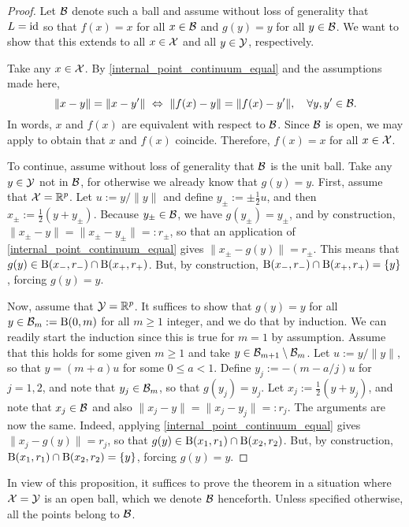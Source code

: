 \documentclass[twoside, 11pt]{article}
\begin{document}
\begin{proof}
Let $\mathcal{B}$ denote such a ball and assume without loss of generality that $L = {\rm id}$ so that $f(x) = x$ for all $x \in \mathcal{B}$ and $g(y) = y$ for all $y \in \mathcal{B}$. 
We want to show that this extends to all $x\in\mathcal{X}$ and all $y\in\mathcal{Y}$, respectively.

Take any $x\in\mathcal{X}$. 
By \eqref{internal_point_continuum_equal} and the assumptions made here,  
\[\|x-y\| = \|x-y'\| \ \Leftrightarrow \  \|f(x)-y\| = \|f(x)-y'\|, \quad \forall y,y' \in \mathcal{B}.\]
In words, $x$ and $f(x)$ are equivalent with respect to $\mathcal{B}$. Since $\mathcal{B}$ is open, we may apply  to obtain that $x$ and $f(x)$ coincide. Therefore, $f(x) = x$ for all $x \in \mathcal{X}$.

To continue, assume without loss of generality that $\mathcal{B}$ is the unit ball. 
Take any $y \in \mathcal{Y}$ not in $\mathcal{B}$, for otherwise we already know that $g(y) = y$. 
First, assume that $\mathcal{X} = \mathbb{R}^p$.
Let $u := y/\|y\|$ and define $y_\pm := \pm \frac12 u$, and then $x_\pm := \frac12(y+y_\pm)$. Because $y_\pm \in \mathcal{B}$, we have $g(y_\pm) = y_\pm$, and by construction, $\|x_\pm - y\| = \|x_\pm - y_\pm\| =: r_\pm$, so that an application of  \eqref{internal_point_continuum_equal} gives
$\|x_\pm - g(y)\| = r_\pm$. This means that $g(y) \in \mathrm{B}(x_-, r_-) \cap \mathrm{B}(x_+, r_+)$. But, by construction, $\mathrm{B}(x_-, r_-) \cap \mathrm{B}(x_+, r_+) = \{y\}$, forcing $g(y) = y$.

Now, assume that $\mathcal{Y} = \mathbb{R}^p$. It suffices to show that $g(y) = y$ for all $y \in \mathcal{B}_m := \mathrm{B}(0, m)$ for all $m \ge 1$ integer, and we do that by induction. We can readily start the induction since this is true for $m = 1$ by assumption. Assume that this holds for some given $m \ge 1$ and take $y \in \mathcal{B}_{m+1}\setminus \mathcal{B}_m$.  
Let $u := y/\|y\|$, so that $y = (m+a) u$ for some $0 \le a < 1$.
Define $y_j := - (m-a/j) u$ for $j = 1,2$, and note that $y_j \in \mathcal{B}_m$, so that $g(y_j) = y_j$. Let $x_j := \frac12(y+y_j)$, and note that $x_j \in \mathcal{B}$ and also $\|x_j - y\| = \|x_j - y_j\| =: r_j$. The arguments are now the same. Indeed, applying \eqref{internal_point_continuum_equal} gives
$\|x_j - g(y)\| = r_j$, so that $g(y) \in \mathrm{B}(x_1, r_1) \cap \mathrm{B}(x_2, r_2)$. But, by construction, $\mathrm{B}(x_1, r_1) \cap \mathrm{B}(x_2, r_2) = \{y\}$, forcing $g(y) = y$.
\end{proof} 

In view of this proposition, it suffices to prove the theorem in a situation where $\mathcal{X} = \mathcal{Y}$ is an open ball, which we denote $\mathcal{B}$ henceforth. Unless specified otherwise, all the points belong to $\mathcal{B}$.
\end{document}
